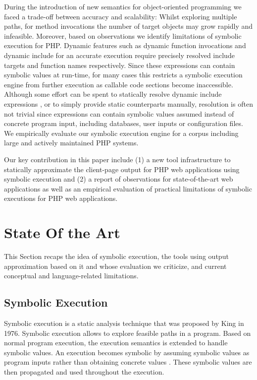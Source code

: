 \documentclass[sigconf]{acmart}
\begin{document}
During the introduction of new semantics for object-oriented programming we
faced a trade-off between accuracy and scalability: Whilst exploring multiple
paths, for method invocations the number of target objects may grow rapidly and
infeasible. Moreover, based on observations we identify limitations of symbolic execution
for PHP. Dynamic features such as dynamic function invocations and dynamic
include for an accurate execution require precisely resolved include targets
and function names respectively. Since these expressions  can contain symbolic
values at run-time, for many cases this restricts a symbolic execution engine
from further execution as callable code sections become inaccessible.
Although some effort can be spent to statically resolve dynamic include
expressions \cite{hills2014static}, or to simply provide static counterparts manually, resolution
is often not trivial since expressions can contain symbolic values assumed instead
of concrete program input, including databases, user inputs or configuration
files. We empirically evaluate our symbolic execution engine for a corpus
including large and actively maintained PHP systems.

Our key contribution in this paper include (1) a new tool infrastructure to
statically approximate the client-page output for PHP web applications using
symbolic execution and (2) a report of observations for state-of-the-art
web applications as well as an empirical evaluation of practical limitations
of symbolic executions for PHP web applications.

\section{State Of the Art}\label{sec:stateoftheart}
This Section recaps the idea of symbolic
execution, the tools using output approximation based on it and whose evaluation
we criticize, and current conceptual and language-related limitations.

\subsection{Symbolic Execution}
Symbolic execution is a static analysis technique that was proposed by King
\cite{King1976} in 1976. Symbolic execution allows to explore feasible paths in
a program. Based on normal program execution, the execution semantics is
extended to handle symbolic values. An execution becomes symbolic by assuming
symbolic values as program inputs rather than obtaining concrete values
\cite{King1976,Darringer1978}. These symbolic values are then propagated and
used throughout the execution.
\end{document}
